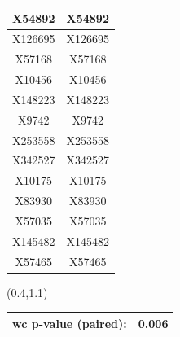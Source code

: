 \documentclass{beamer}
\begin{document}
\begin{frame}[plain]
\begin{textblock*}{\paperwidth}
\begin{tabular}{| c c |}
X54892  &  X54892 \\ \hline 
X126695  &  X126695 \\ \hline 
X57168  &  X57168 \\ \hline 
X10456  &  X10456 \\ \hline 
X148223  &  X148223 \\ \hline 
X9742  &  X9742 \\ \hline 
X253558  &  X253558 \\ \hline 
X342527  &  X342527 \\ \hline 
X10175  &  X10175 \\ \hline 
X83930  &  X83930 \\ \hline 
X57035  &  X57035 \\ \hline 
X145482  &  X145482 \\ \hline 
X57465  &  X57465 \\ \hline 
    \end{tabular}
    \hspace{.5em}
  \end{textblock*}
  \begin{textblock*}{\paperwidth}(0.4\textwidth,1.1\textheight)
    \raggedright 
    \tiny
    \begin{tabular}{| c c |}
      \hline
      wc p-value (paired): & 0.006 \\ \hline
    \end{tabular}
    \hspace{.5em}
  \end{textblock*}
\end{frame}
\end{document}
